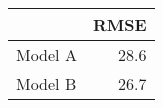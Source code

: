 
\begin{tabular}{l|r}
\hline
  & RMSE\\
\hline
Model A & 28.6\\
\hline
Model B & 26.7\\
\hline
\end{tabular}